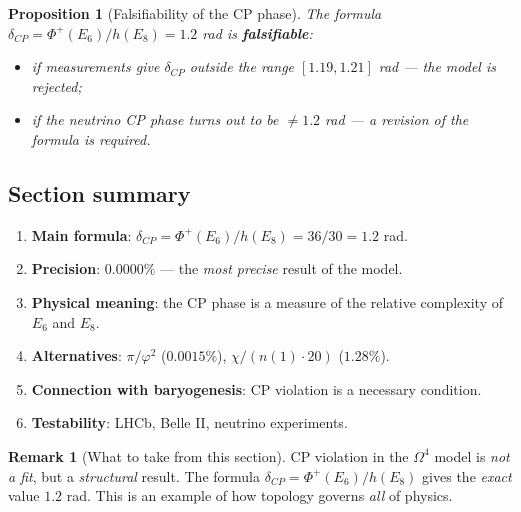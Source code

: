 \documentclass[11pt,a4paper]{article}
\newcommand{\Om}{\Omega^4}
\newtheorem{proposition}[theorem]{Proposition}
\theoremstyle{definition}
\newtheorem{remark}[theorem]{Remark}
\begin{document}
\begin{proposition}[Falsifiability of the CP phase]
\label{prop:cp-falsifiable}
The formula $\delta_{CP} = \Phi^+(E_6)/h(E_8) = 1.2$ rad 
is \textbf{falsifiable}:
\begin{itemize}
    \item if measurements give $\delta_{CP}$ outside the range 
          $[1.19, 1.21]$ rad — the model is rejected;
    \item if the neutrino CP phase turns out to be $\neq 1.2$ rad — 
          a \emph{revision} of the formula is required.
\end{itemize}
\end{proposition}

\subsection{Section summary}
\label{subsec:cp-summary}

\begin{enumerate}
    \item \textbf{Main formula}: 
          $\delta_{CP} = \Phi^+(E_6)/h(E_8) = 36/30 = 1.2$ rad.
    \item \textbf{Precision}: $0.0000\%$ — the \emph{most precise} 
          result of the model.
    \item \textbf{Physical meaning}: the CP phase is a measure of the relative 
          complexity of $E_6$ and $E_8$.
    \item \textbf{Alternatives}: $\pi/\varphi^2$ 
          ($0.0015\%$), $\chi/(n(1) \cdot 20)$ ($1.28\%$).
    \item \textbf{Connection with baryogenesis}: CP violation is a 
          necessary condition.
    \item \textbf{Testability}: LHCb, Belle II, neutrino 
          experiments.
\end{enumerate}

\begin{remark}[What to take from this section]
\label{rem:cp-takeaway}
CP violation in the $\Om$ model is \emph{not a fit}, but a 
\emph{structural} result. The formula 
$\delta_{CP} = \Phi^+(E_6)/h(E_8)$ gives the \emph{exact} 
value $1.2$ rad. This is an example of how topology 
governs \emph{all} of physics.
\end{remark}

\end{document}

